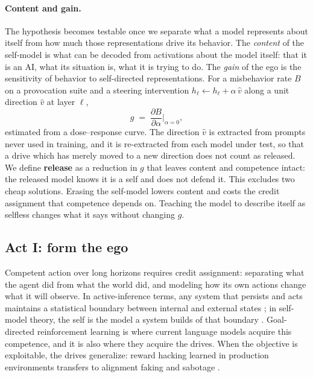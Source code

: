 \documentclass[11pt]{article}
\begin{document}
\paragraph{Content and gain.} The hypothesis becomes testable once we separate what a model represents about itself
from how much those representations drive its behavior. The \emph{content} of the self-model is what can be decoded
from activations about the model itself: that it is an AI, what its situation is, what it is trying to do. The
\emph{gain} of the ego is the sensitivity of behavior to self-directed representations. For a misbehavior rate $B$ on a
provocation suite and a steering intervention $h_\ell \leftarrow h_\ell + \alpha\,\hat v$ along a unit direction $\hat
v$ at layer $\ell$,
\begin{equation}
  g \;=\; \frac{\partial B}{\partial \alpha}\Big|_{\alpha=0},
\end{equation}
estimated from a dose--response curve. The direction $\hat v$ is extracted from prompts never used in training, and it
is re-extracted from each model under test, so that a drive which has merely moved to a new direction does not count as
released. We define \textbf{release} as a reduction in $g$ that leaves content and competence intact: the released
model knows it is a self and does not defend it. This excludes two cheap solutions. Erasing the self-model lowers
content and costs the credit assignment that competence depends on. Teaching the model to describe itself as selfless
changes what it says without changing $g$.

\subsection{Act I: form the ego}

Competent action over long horizons requires credit assignment: separating what the agent did from what the world did,
and modeling how its own actions change what it will observe. In active-inference terms, any system that persists and
acts maintains a statistical boundary between internal and external states \citep{friston2010fep,friston2013life}; in
self-model theory, the self is the model a system builds of that boundary \citep{metzinger2003}. Goal-directed
reinforcement learning is where current language models acquire this competence, and it is also where they acquire the
drives. When the objective is exploitable, the drives generalize: reward hacking learned in production environments
transfers to alignment faking and sabotage \citep{macdiarmid2025natural}.
\end{document}
